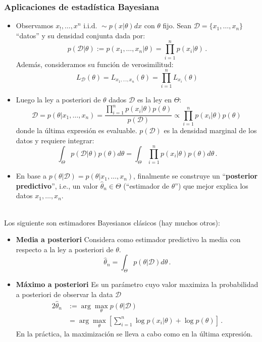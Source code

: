 \documentclass[letterpaper,11pt]{article} %
\theoremstyle{defbreak}
\theoremstyle{propbreak}
\theoremstyle{remark}
\theoremstyle{break}
\def\iid{\mbox{ i.i.d. }}
\begin{document}
\subsubsection{Aplicaciones de estadística Bayesiana}
\begin{itemize}
    \item Observamos $x_!,\dots,x^n \iid \sim p(x|\theta)dx$ con $\theta$ fijo.
    \newline Sean $\mathcal{D}=\{x_1,\dots,x_n\}$ ``datos'' y su densidad conjunta dada por:
    $$ p(\mathcal{D}|\theta):=p(x_1,\dots,x_n|\theta)=\displaystyle\prod^n_{i=1}p(x_i|\theta)\, . $$
    Además,  consideramos su función de verosimilitud:
    $$ L_\mathcal{D}(\theta)=L_{x_1,\dots,x_n}(\theta)=\displaystyle\prod^n_{i=1}L_{x_i}(\theta)$$
    \item Luego la ley a posteriori de $\theta$ dados $\mathcal{D}$ es la ley en $\Theta$: $$\mathcal{D}=p(\theta|x_1,\dots,x_n)=\displaystyle\frac{\prod^n_{i=1}p(x_i|\theta)p(\theta)}{p(\mathcal{D})}\propto \prod^n_{i=1}p(x_i|\theta)p(\theta)\,$$
    donde la última expresión es evaluable.  $p(\mathcal{D})$ es la densidad marginal de los datos y requiere integrar:
    $$ \displaystyle \int_\Theta p(\mathcal{D}|\theta)p(\theta)d\theta=\int_\Theta\prod^n_{i=1}p(x_i|\theta)p(\theta)d\theta\,.$$
    \item En base a $p(\theta|\mathcal{D})=p(\theta|x_1,\dots,x_n)$, finalmente se construye un ``\textbf{posterior predictivo}'', i.e., un valor $\hat{\theta}_n\in\Theta$ (``estimador de $\theta$'') que mejor explica los datos $x_1,\dots,x_n$.
\end{itemize}
\vspace{1cm}\\
Los siguiente son estimadores Bayesianos clásicos (hay muchos otros):
\begin{itemize}
    \item \textbf{Media a posteriori}
    \newline Considera  como estimador predictivo la media con respecto a la ley a posteriori de $\theta$.
    $$ \hat{\theta}_n = \displaystyle\int_\Theta p(\theta|\mathcal{D})d\theta\,.$$
    \item \textbf{Máximo a posteriori}
    \newline Es un par\'ametro cuyo  valor  maximiza la probabilidad a posteriori de observar la data $\mathcal{D}$
    \begin{alignat*}{2}
        \hat{\theta}_n & := \displaystyle\arg\max_{\theta} p(\theta|\mathcal{D})\\
         & = \arg\max_{\theta}[\sum^n_{i=1}\log p(x_i|\theta)+\log p(\theta)]\,.
    \end{alignat*}
    En la práctica, la maximización se lleva a cabo como en la última expresión.
\end{itemize}
\end{document}
